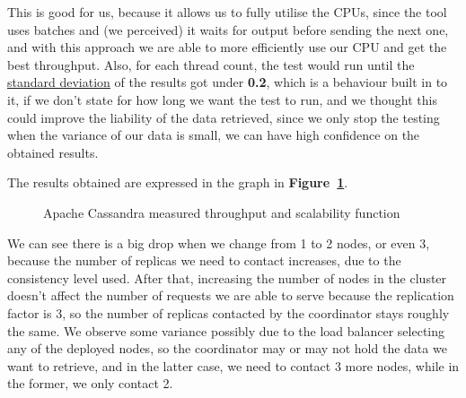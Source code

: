 \documentclass[runningheads]{llncs}
\begin{document}
 This is good for us, because it allows us to fully utilise the CPUs, since the tool uses batches and (we perceived) it waits for output before sending the next one, and with this approach we are able to more efficiently use our CPU and get the best throughput. Also, for each thread count, the test would run until the \underline{standard deviation} of the results got under \textbf{0.2}, which is a behaviour built in to it, if we don't state for how long we want the test to run, and we thought this could improve the liability of the data retrieved, since we only stop the testing when the variance of our data is small, we can have high confidence on the obtained results.\par

The results obtained are expressed in the graph in \textbf{Figure~\ref{Graph:scalability}}.

\begin{figure}
    \begin{center}
    \end{center}
    \caption{Apache Cassandra measured throughput and scalability function}
    \label{Graph:scalability}
\end{figure}

We can see there is a big drop when we change from 1 to 2 nodes, or even 3, because the number of replicas we need to contact increases, due to the consistency level used. After that, increasing the number of nodes in the cluster doesn't affect the number of requests we are able to serve because the replication factor is 3, so the number of replicas contacted by the coordinator stays roughly the same.
We observe some variance possibly due to the load balancer selecting any of the deployed nodes, so the coordinator may or may not hold the data we want to retrieve, and in the latter case, we need to contact 3 more nodes, while in the former, we only contact 2.\par
\end{document}
